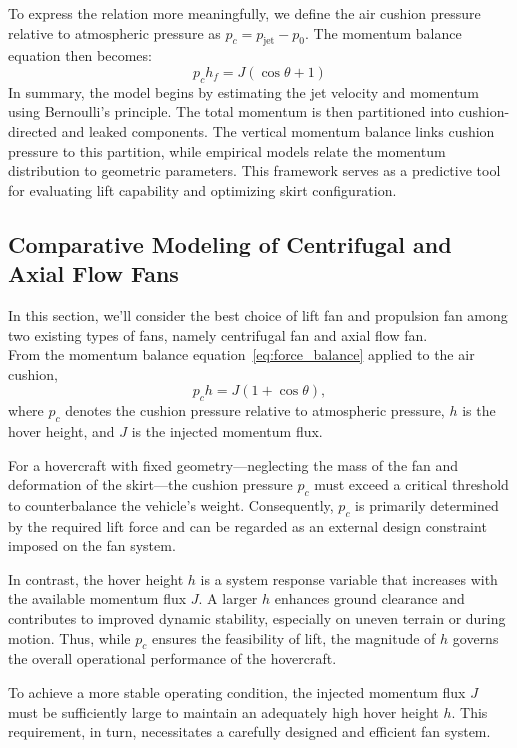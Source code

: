 To express the relation more meaningfully, we define the air cushion pressure relative to atmospheric pressure as \( p_c = p_{\text{jet}} - p_0 \). The momentum balance equation then becomes:
\begin{equation}
    p_c h_f = J ( \cos \theta + 1)
    \label{eq:force_balance}
\end{equation}
In summary, the model begins by estimating the jet velocity and momentum using Bernoulli’s principle. The total momentum is then partitioned into cushion-directed and leaked components. The vertical momentum balance links cushion pressure to this partition, while empirical models relate the momentum distribution to geometric parameters. This framework serves as a predictive tool for evaluating lift capability and optimizing skirt configuration.

\subsection{Comparative Modeling of Centrifugal and Axial Flow Fans}
In this section, we'll consider the best choice of lift fan and propulsion fan among two existing types of fans, namely centrifugal fan and axial flow fan.\\
From the momentum balance equation~\eqref{eq:force_balance} applied to the air cushion,
\[
    p_c h = J(1 + \cos\theta),
\]
where \( p_c \) denotes the cushion pressure relative to atmospheric pressure, \( h \) is the hover height, and \( J \) is the injected momentum flux.

For a hovercraft with fixed geometry—neglecting the mass of the fan and deformation of the skirt—the cushion pressure \( p_c \) must exceed a critical threshold to counterbalance the vehicle’s weight. Consequently, \( p_c \) is primarily determined by the required lift force and can be regarded as an external design constraint imposed on the fan system.

In contrast, the hover height \( h \) is a system response variable that increases with the available momentum flux \( J \). A larger \( h \) enhances ground clearance and contributes to improved dynamic stability, especially on uneven terrain or during motion. Thus, while \( p_c \) ensures the feasibility of lift, the magnitude of \( h \) governs the overall operational performance of the hovercraft.

To achieve a more stable operating condition, the injected momentum flux \( J \) must be sufficiently large to maintain an adequately high hover height \( h \). This requirement, in turn, necessitates a carefully designed and efficient fan system.

